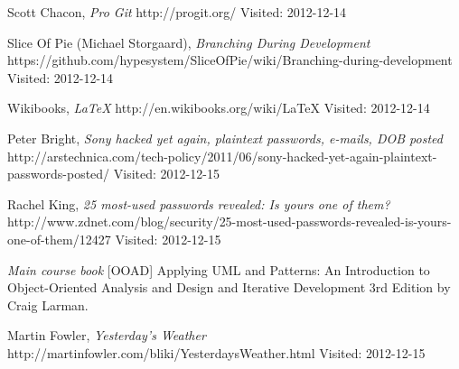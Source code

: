 \begin{thebibliography}{99}
        Scott Chacon,
        \emph{Pro Git}\newline
        http://progit.org/\newline
        Visited: 2012-12-14
        
        Slice Of Pie (Michael Storgaard),
        \emph{Branching During Development}\newline
        https://github.com/hypesystem/SliceOfPie/wiki/Branching-during-development\newline
        Visited: 2012-12-14
        
        Wikibooks,
        \emph{\LaTeX}\newline
        http://en.wikibooks.org/wiki/LaTeX\newline
        Visited: 2012-12-14
        
        Peter Bright,
        \emph{Sony hacked yet again, plaintext passwords, e-mails, DOB posted}\newline
        http://arstechnica.com/tech-policy/2011/06/sony-hacked-yet-again-plaintext-passwords-posted/\newline
        Visited: 2012-12-15
    
        Rachel King,
        \emph{25 most-used passwords revealed: Is yours one of them?}\newline
        http://www.zdnet.com/blog/security/25-most-used-passwords-revealed-is-yours-one-of-them/12427\newline
        Visited: 2012-12-15
        
        	\emph{Main course book}
        	[OOAD] Applying UML and Patterns: An Introduction to Object-Oriented Analysis and Design and Iterative Development 3rd Edition by Craig Larman.
        	
        Martin Fowler,
        \emph{Yesterday's Weather}\newline
        http://martinfowler.com/bliki/YesterdaysWeather.html\newline
        Visited: 2012-12-15
\end{thebibliography}